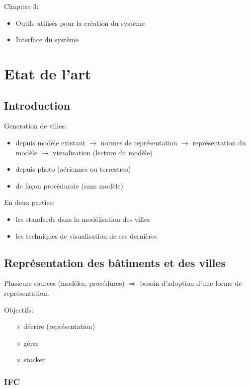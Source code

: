 \documentclass[11pt]{report}
\begin{document}
Chapitre 3:
\begin{itemize}
\item Outils utilisés pour la création du système
\item Interface du système
\end{itemize}

\chapter{Etat de l'art}

\section{Introduction}

Generation de villes:

\begin{itemize}
	\item depuis modèle existant $\rightarrow$ normes de représentation $\rightarrow$ représentation du modèle $\rightarrow$ visualisation (lecture du modèle) 
	\item depuis photo (aériennes ou terrestres)
	\item de façon procédurale (sans modèle)
\end{itemize}

En deux parties: 
\begin{itemize}
	\item les standards dans la modélisation des villes
	\item les techniques de visualisation de ces dernières
\end{itemize}

\section{Représentation des bâtiments et des villes}

Plusieurs sources (modèles, procédures) $\Rightarrow$ besoin d'adoption d'une forme de représentation.

Objectifs:
\begin{itemize}
\item[$\times$] décrire (représentation)
\item[$\times$] gérer
\item[$\times$] stocker
\end{itemize}

\subsection{IFC}
\end{document}
